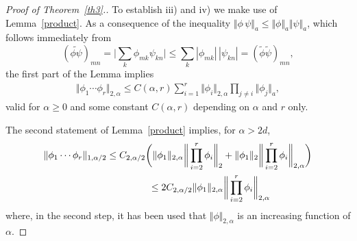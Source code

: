 \documentclass[pdftex]{sigma}
\begin{document}
\begin{proof}[Proof of Theorem~\ref{th3}.]
To establish iii) and iv) we make use of Lemma~\ref{product}. As a
consequence of the inequality
$\Vert\phi\,\psi\Vert_a\leq\Vert\phi\Vert_a \Vert\psi\Vert_a$, which
follows immediately from
\[
(\widetilde{\phi\psi})_{mn} = \bigg|\sum_k\phi_{mk} \psi_{kn}\bigg| \leq \sum_k|\phi_{mk}|\,|\psi_{kn}| = (\widetilde\phi \widetilde\psi)_{mn} ,
\]
the f\/irst part of the Lemma implies
\begin{gather}
\label{prodnorm1}
\Vert\phi_1\cdots\phi_r\Vert_{2,\alpha}\leq
C(\alpha,r)  \sum_{i=1}^r\Vert\phi_i\Vert_{2,\alpha} \prod_{j\ne i}\Vert\phi_j\Vert_a ,
\end{gather}
valid for $\alpha\geq 0$ and some constant $C(\alpha,r)$ depending
on $\alpha$ and $r$ only.

The second statement of Lemma~\ref{product} implies, for $\alpha>2d$,
\begin{gather*}%
\Vert\phi_1\cdots\phi_r\Vert_{1,\alpha/2} \leq
C_{2,\alpha/2} \bigg(\Vert\phi_1\Vert_{2,\alpha} \bigg\Vert\prod_{i=2}^r\phi_i\bigg\Vert_2 +
 \Vert\phi_1\Vert_2 \bigg\Vert\prod_{i=2}^r\phi_i\bigg\Vert_{2,\alpha}\bigg)\\
 \hphantom{\Vert\phi_1\cdots\phi_r\Vert_{1,\alpha/2}}{}
 \leq
2C_{2,\alpha/2} \Vert\phi_1\Vert_{2,\alpha} \bigg\Vert\prod_{i=2}^r\phi_i\bigg\Vert_{2,\alpha}
\end{gather*}
 where, in the second step, it has been used that $\Vert\phi\Vert_{2,\alpha}$ is an
increasing function of $\alpha$.


\end{proof}
\end{document}
